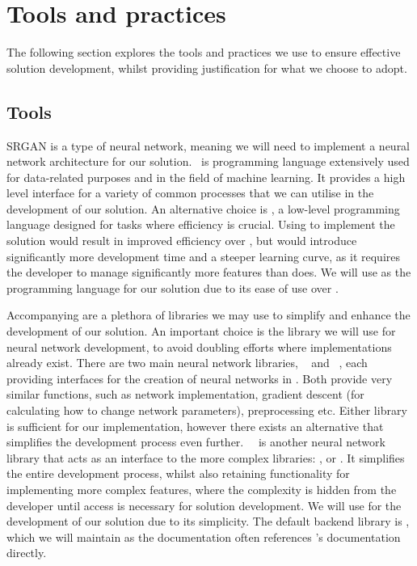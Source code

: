 \section{Tools and practices}\label{sec:tools_and_practices}
The following section explores the tools and practices we use to ensure effective solution development, whilst providing justification for what we choose to adopt.

\subsection{Tools}
SRGAN is a type of neural network, meaning we will need to implement a neural network architecture for our solution.\  is programming language extensively used for data-related purposes and in the field of machine learning. It provides a high level interface for a variety of common processes that we can utilise in the development of our solution. An alternative choice is , a low-level programming language designed for tasks where efficiency is crucial. Using  to implement the solution would result in improved efficiency over , but would introduce significantly more development time and a steeper learning curve, as it requires the developer to manage significantly more features than  does. We will use  as the programming language for our solution due to its ease of use over .

Accompanying  are a plethora of libraries we may use to simplify and enhance the development of our solution. An important choice is the library we will use for neural network development, to avoid doubling efforts where implementations already exist. There are two main neural network libraries, ~\cite{tensorflow} and ~\cite{pytorch}, each providing interfaces for the creation of neural networks in . Both provide very similar functions, such as network implementation, gradient descent (for calculating how to change network parameters), preprocessing etc. Either library is sufficient for our implementation, however there exists an alternative that simplifies the development process even further.\ ~\cite{keras} is another neural network library that acts as an interface to the more complex libraries: ,  or . It simplifies the entire development process, whilst also retaining functionality for implementing more complex features, where the complexity is hidden from the developer until access is necessary for solution development. We will use  for the development of our solution due to its simplicity. The default backend library is , which we will maintain as the  documentation often references 's documentation directly.

